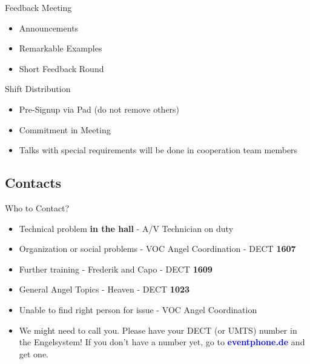 \documentclass[hyperref={pdfpagelabels=false},aspectratio=169]{beamer}
\begin{document}
\begin{frame}{Feedback Meeting}
\begin{itemize}
	\item Announcements
	\item Remarkable Examples
	\item Short Feedback Round 
\end{itemize} 
\end{frame}

\begin{frame}{Shift Distribution}
\begin{itemize}
	\item Pre-Signup via Pad (do not remove others) %
	\item Commitment in Meeting %
	\item Talks with special requirements will be done in cooperation team members %
\end{itemize} 
\end{frame}


\subsection{Contacts}
\begin{frame}{Who to Contact?}
\begin{itemize}
\item Technical problem \textbf{in the hall} - A/V Technician on duty
\item Organization or social problems - VOC Angel Coordination - DECT \textbf{1607}
\item Further training - Frederik and Capo - DECT \textbf{1609}
\item General Angel Topics - Heaven - DECT \textbf{1023}
\item Unable to find right person for issue - VOC Angel Coordination
\item We might need to call you. Please have your DECT (or UMTS) number in the Engelsystem! If you don't have a number yet, go to 
\textcolor{blue}{\textbf{eventphone.de}} and get one. 
\end{itemize} 
\end{frame}


\end{document}
